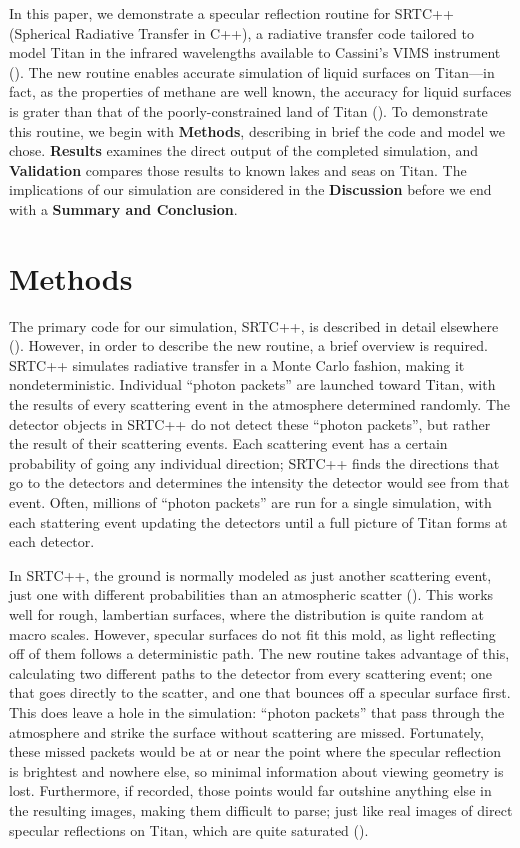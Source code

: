 \documentclass{article}
\begin{document}
In this paper, we demonstrate a specular reflection routine for SRTC++ (Spherical Radiative Transfer in C++), a radiative transfer code tailored to model Titan in the infrared wavelengths available to Cassini's VIMS instrument (\cite{Barnes2018}). The new routine enables accurate simulation of liquid surfaces on Titan---in fact, as the properties of methane are well known, the accuracy for liquid surfaces is grater than that of the poorly-constrained land of Titan (\cite{Trainer2018}). To demonstrate this routine, we begin with \textbf{Methods}, describing in brief the code and model we chose. \textbf{Results} examines the direct output of the completed simulation, and \textbf{Validation} compares those results to known lakes and seas on Titan. The implications of our simulation are considered in the \textbf{Discussion} before we end with a \textbf{Summary and Conclusion}.

\section{Methods}
The primary code for our simulation, SRTC++, is described in detail elsewhere (\cite{Barnes2018}). However, in order to describe the new routine, a brief overview is required. SRTC++ simulates radiative transfer in a Monte Carlo fashion, making it nondeterministic. Individual ``photon packets'' are launched toward Titan, with the results of every scattering event in the atmosphere determined randomly. The detector objects in SRTC++ do not detect these ``photon packets'', but rather the result of their scattering events. Each scattering event has a certain probability of going any individual direction; SRTC++ finds the directions that go to the detectors and determines the intensity the detector would see from that event. Often, millions of ``photon packets'' are run for a single simulation, with each stattering event updating the detectors until a full picture of Titan forms at each detector.

In SRTC++, the ground is normally modeled as just another scattering event, just one with different probabilities than an atmospheric scatter (\cite{Barnes2018}). This works well for rough, lambertian surfaces, where the distribution is quite random at macro scales. However, specular surfaces do not fit this mold, as light reflecting off of them follows a deterministic path.  The new routine takes advantage of this, calculating two different paths to the detector from every scattering event; one that goes directly to the scatter, and one that bounces off a specular surface first. This does leave a hole in the simulation: ``photon packets'' that pass through the atmosphere and strike the surface without scattering are missed. Fortunately, these missed packets would be at or near the point where the specular reflection is brightest and nowhere else, so minimal information about viewing geometry is lost. Furthermore, if recorded, those points would far outshine anything else in the resulting images, making them difficult to parse; just like real images of direct specular reflections on Titan, which are quite saturated (\cite{Barnes2013}).
\end{document}
